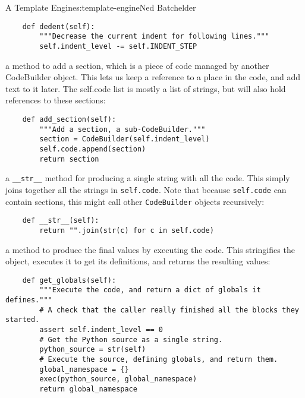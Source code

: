 \begin{aosachapter}{A Template Engine}{s:template-engine}{Ned Batchelder}
\begin{verbatim}
    def dedent(self):
        """Decrease the current indent for following lines."""
        self.indent_level -= self.INDENT_STEP
\end{verbatim}

\begin{aosaitemize}

\item
  a method to add a section, which is a piece of code managed by another
  CodeBuilder object. This lets us keep a reference to a place in the
  code, and add text to it later. The self.code list is mostly a list of
  strings, but will also hold references to these sections:
\end{aosaitemize}

\begin{verbatim}
    def add_section(self):
        """Add a section, a sub-CodeBuilder."""
        section = CodeBuilder(self.indent_level)
        self.code.append(section)
        return section
\end{verbatim}

\begin{aosaitemize}

\item
  a \texttt{\_\_str\_\_} method for producing a single string with all
  the code. This simply joins together all the strings in
  \texttt{self.code}. Note that because \texttt{self.code} can contain
  sections, this might call other \texttt{CodeBuilder} objects
  recursively:
\end{aosaitemize}

\begin{verbatim}
    def __str__(self):
        return "".join(str(c) for c in self.code)
\end{verbatim}

\begin{aosaitemize}

\item
  a method to produce the final values by executing the code. This
  stringifies the object, executes it to get its definitions, and
  returns the resulting values:
\end{aosaitemize}

\begin{verbatim}
    def get_globals(self):
        """Execute the code, and return a dict of globals it defines."""
        # A check that the caller really finished all the blocks they started.
        assert self.indent_level == 0
        # Get the Python source as a single string.
        python_source = str(self)
        # Execute the source, defining globals, and return them.
        global_namespace = {}
        exec(python_source, global_namespace)
        return global_namespace
\end{verbatim}


\end{aosachapter}
